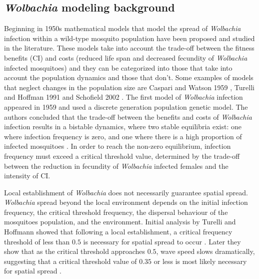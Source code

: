 \documentclass{ws-rv9x6}
\begin{document}
\subsection{\textit{Wolbachia} modeling background}
Beginning in 1950s mathematical models that model the spread of \textit{Wolbachia} infection within a wild-type mosquito population have been proposed and studied in the literature. These models take into account the trade-off between the fitness benefits (CI) and costs (reduced life span and decreased fecundity of \textit{Wolbachia} infected mosquitoes) and they can be categorized into those that take into account the population dynamics and those that don't. Some examples of models that neglect changes in the population size are Caspari and Watson 1959 \cite{caspari1959evolutionary}, Turelli and Hoffman 1991 \cite{turelli1991rapid} and Schofield 2002 \cite{schofield2002spatially}. 
The first model of \textit{Wolbachia} infection appeared in 1959 and used a discrete generation population genetic model. The authors concluded that the trade-off between the benefits and costs of \textit{Wolbachia} infection results in a bistable dynamics, where two stable equilibria exist: one where infection frequency is zero, and one where there is a high proportion of infected mosquitoes \cite{caspari1959evolutionary}. In order to reach the non-zero equilibrium, infection frequency must exceed a critical threshold value, determined by the trade-off between the reduction in fecundity of \textit{Wolbachia} infected females and the intensity of CI.  

Local establishment of \textit{Wolbachia} does not necessarily guarantee spatial spread. \textit{Wolbachia} spread beyond the local environment depends on the initial infection frequency, the critical threshold frequency, the dispersal behaviour of the mosquitoes population, and the environment. Initial analysis by Turelli and Hoffmann showed that following a local establishment, a critical frequency threshold of less than $0.5$ is necessary for spatial spread to occur \cite{turelli1991rapid}. Later they show that as the critical threshold approaches $0.5$, wave speed slows dramatically, suggesting that a critical threshold value of $0.35$ or less is most likely necessary for spatial spread  \cite{turelli2017deploying}.
\end{document}
